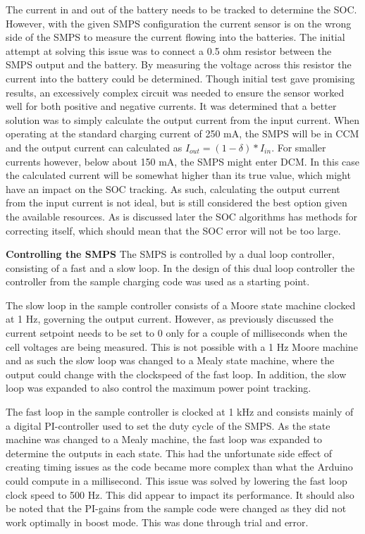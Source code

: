 \documentclass[a4paper]{article}
\begin{document}
The current in and out of the battery needs to be tracked to determine the SOC.
However, with the given SMPS configuration the current sensor is on the wrong side of
the SMPS to measure the current flowing into the batteries. The initial attempt at solving
this issue was to connect a 0.5 ohm resistor between the SMPS output and the battery.
By measuring the voltage across this resistor the current into the battery could be
determined. Though initial test gave promising results, an excessively complex circuit
was needed to ensure the sensor worked well for both positive and negative currents.
It was determined that a better solution was to simply calculate the output current
from the input current. When operating at the standard charging current of 250 mA,
the SMPS will be in CCM and the output current can calculated as \( I_{out} = (1 - \delta)*I_{in} \).
For smaller currents however, below about 150 mA, the SMPS might enter DCM. In this case the calculated 
current will be somewhat higher than its true value, which might have an impact on the 
SOC tracking. As such, calculating the output current from the input current is not ideal, 
but is still considered the best option given the available resources. As is discussed 
later the SOC algorithms has methods for correcting itself, which should mean that the
SOC error will not be too large.

\textbf{Controlling the SMPS}
\vspace{10pt} 
\newline
The SMPS is controlled by a dual loop controller, consisting of a fast and a slow loop.
In the design of this dual loop controller the controller from the sample charging code
was used as a starting point\cite{chargeCode}. 

The slow loop in the sample controller consists
of a Moore state machine clocked at 1 Hz, governing the output current. However, as previously
discussed the current setpoint needs to be set to 0 only for a couple of milliseconds when
the cell voltages are being measured. This is not possible with a 1 Hz Moore machine and
as such the slow loop was changed to a Mealy state machine, where the output could change
with the clockspeed of the fast loop. In addition, the slow loop was expanded to also control
the maximum power point tracking.

The fast loop in the sample controller is clocked at 1 kHz and consists mainly of a 
digital PI-controller used to set the duty cycle of the SMPS. As the state machine 
was changed to a Mealy machine, the fast loop was expanded to determine the outputs in
each state. This had the unfortunate side effect of creating timing issues as the code
became more complex than what the Arduino could compute in a millisecond. This issue was
solved by lowering the fast loop clock speed to 500 Hz. This did appear to impact its
performance.
It should also be noted that the PI-gains from the sample code were changed as they did
not work optimally in boost mode. This was done through trial and error.
\end{document}
